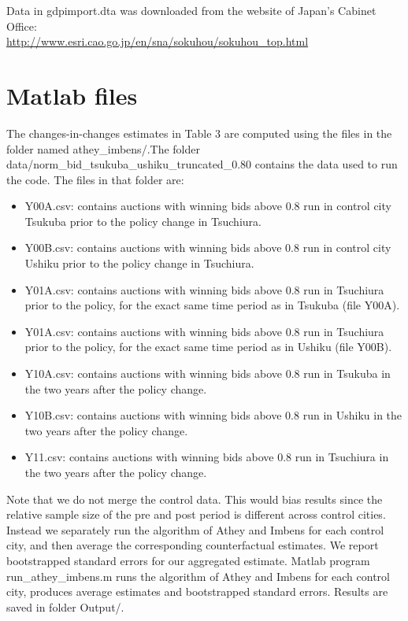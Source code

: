 \documentclass[12pt,  letterpaper]{article}
\newcommand{\1}{\mathbf{1}}
\begin{document}
Data in \textsf{gdpimport.dta} was downloaded from the website of Japan's Cabinet Office:\\ \url{http://www.esri.cao.go.jp/en/sna/sokuhou/sokuhou\_top.html}

\section{Matlab files}
The changes-in-changes estimates in Table 3 are computed using the files in the folder named \textsf{athey\_imbens/}.The folder \textsf{data/norm\_bid\_tsukuba\_ushiku\_truncated\_0.80} contains the data used to run the code. The files in that folder are:

\begin{onehalfspacing}
\begin{itemize}
\item \textsf{Y00A.csv}: contains auctions with winning bids above $0.8$ run in control city Tsukuba prior to the policy change in Tsuchiura.
\item \textsf{Y00B.csv}: contains auctions with winning bids above $0.8$ run in control city Ushiku prior to the policy change in Tsuchiura. 
\item \textsf{Y01A.csv}: contains auctions with winning bids above $0.8$ run in Tsuchiura prior to the policy, for the exact same time period as in Tsukuba (file Y00A).
\item \textsf{Y01A.csv}: contains auctions with winning bids above $0.8$ run in Tsuchiura prior to the policy, for the exact same time period as in Ushiku (file Y00B). 
\item \textsf{Y10A.csv}: contains auctions with winning bids above $0.8$ run in Tsukuba in the two years after the policy change.
\item \textsf{Y10B.csv}: contains auctions with winning bids above $0.8$ run in Ushiku in the two years after the policy change.
\item \textsf{Y11.csv}: contains auctions with winning bids above $0.8$ run in Tsuchiura in the two years after the policy change. 
\end{itemize}
\end{onehalfspacing}


Note that we do not merge the control data. This would bias results since the relative sample size of the pre and post period is different across control cities. Instead we separately run the algorithm of Athey and Imbens for each control city, and then average the corresponding counterfactual estimates. We report bootstrapped standard errors for our aggregated estimate. Matlab program \textsf{run\_athey\_imbens.m} runs the algorithm of Athey and Imbens for each control city, produces average estimates and bootstrapped standard errors. Results are saved in folder \textsf{Output/}.   
\end{document}
